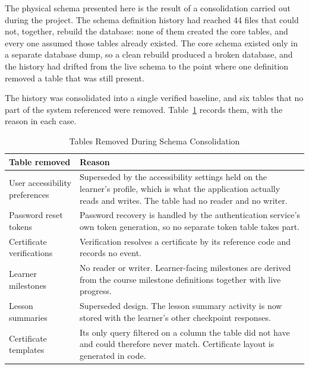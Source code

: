 \documentclass[12pt, oneside]{article} %
\newcommand{\tabbreak}{\hyphenpenalty=200\exhyphenpenalty=200\tolerance=4000\hbadness=10000\hspace{0pt}}
\begin{document}
The physical schema presented here is the result of a consolidation carried out during the project. The schema definition history had reached 44 files that could not, together, rebuild the database: none of them created the core tables, and every one assumed those tables already existed. The core schema existed only in a separate database dump, so a clean rebuild produced a broken database, and the history had drifted from the live schema to the point where one definition removed a table that was still present.

The history was consolidated into a single verified baseline, and six tables that no part of the system referenced were removed. Table~\ref{tab:removed_tables} records them, with the reason in each case.

\begin{table}[H]
\caption{Tables Removed During Schema Consolidation}
\label{tab:removed_tables}
\vspace{-4mm}
\begin{center}
\renewcommand{\arraystretch}{1.2}
\footnotesize
\begin{tabular}{|>{\raggedright\arraybackslash\tabbreak}p{4.0cm}|>{\raggedright\arraybackslash\tabbreak}p{9.81cm}|}
\hline
\textbf{Table removed} & \textbf{Reason} \\
\hline \hline
User accessibility preferences & Superseded by the accessibility settings held on the learner's profile, which is what the application actually reads and writes. The table had no reader and no writer. \\ \hline
Password reset tokens & Password recovery is handled by the authentication service's own token generation, so no separate token table takes part. \\ \hline
Certificate verifications & Verification resolves a certificate by its reference code and records no event. \\ \hline
Learner milestones & No reader or writer. Learner-facing milestones are derived from the course milestone definitions together with live progress. \\ \hline
Lesson summaries & Superseded design. The lesson summary activity is now stored with the learner's other checkpoint responses. \\ \hline
Certificate templates & Its only query filtered on a column the table did not have and could therefore never match. Certificate layout is generated in code. \\ \hline
\end{tabular}
\end{center}
\end{table}
\end{document}
